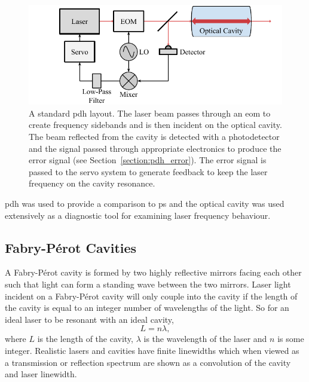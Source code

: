 \begin{figure}
\centering
\includegraphics{part1/Figs/PDH.pdf}
\caption[Pound-Drever-Hall frequency stabilisation setup.]{A standard \gls{pdh} layout.
The laser beam passes through an \gls{eom} to create frequency sidebands and is then incident on the optical cavity.
The beam reflected from the cavity is detected with a photodetector and the signal passed through appropriate electronics to produce the error signal (see Section~\ref{section:pdh_error}).
The error signal is passed to the servo system to generate feedback to keep the laser frequency on the cavity resonance.}
\label{figure:pdh_schematic}
\end{figure}

\Gls{pdh} was used to provide a comparison to \gls{ps} and the optical cavity was used extensively as a diagnostic tool for examining laser frequency behaviour.

\subsection{Fabry-P\'erot Cavities}\label{section:cavity_theory}
A Fabry-P\'erot cavity is formed by two highly reflective mirrors facing each other such that light can form a standing wave between the two mirrors.
Laser light incident on a Fabry-P\'erot cavity will only couple into the cavity if the length of the cavity is equal to an integer number of wavelengths of the light.
So for an ideal laser to be resonant with an ideal cavity,
\begin{equation}
L = n \lambda,
\end{equation}
where $L$ is the length of the cavity, $\lambda$ is the wavelength of the laser and $n$ is some integer.
Realistic lasers and cavities have finite linewidths which when viewed as a transmission or reflection spectrum are shown as a convolution of the cavity and laser linewidth.

